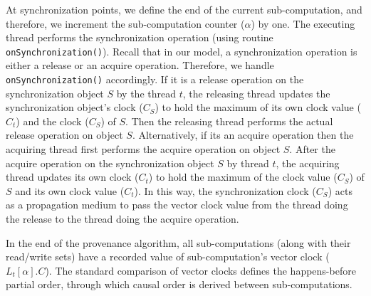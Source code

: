 At synchronization points, we define the end of the current sub-computation, and therefore, we increment the sub-computation  counter ($\alpha$) by one. The executing thread performs the synchronization operation (using routine {\tt onSynchronization()}). Recall that in our model, a synchronization operation is either a release or an acquire operation. Therefore, we handle {\tt onSynchronization()} accordingly. If it is a release operation on the synchronization object $S$ by the thread $t$, the 
releasing thread updates the synchronization object's clock ($C_S$) to
hold the maximum of its own clock value ($C_{t}$) and the clock  ($C_S$) of $S$. Then the releasing thread performs the actual release operation  on object $S$. Alternatively, if its an acquire operation then the acquiring thread first performs the acquire  operation on object $S$. After the acquire operation on the synchronization object $S$ by
thread $t$, the acquiring thread updates its own clock ($C_{t}$) to hold the
maximum of the clock value  ($C_S$) of $S$  and its own clock value ($C_{t}$).  
In this way, the synchronization clock ($C_S$) acts as a propagation medium to pass the
vector clock value from the thread doing the release to the thread doing the acquire operation. 



In the end of the provenance algorithm, all sub-computations (along with their read/write sets) have a recorded value of sub-computation's vector clock ($L_t[\alpha].C$). The standard comparison of vector clocks defines the  happens-before partial order, through which causal order is derived between sub-computations.


